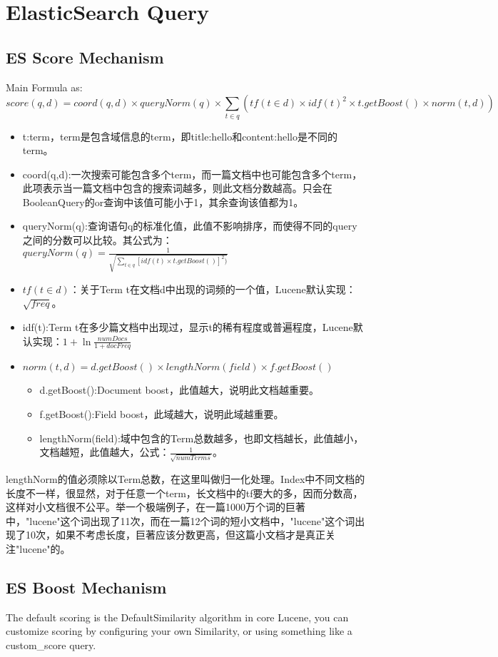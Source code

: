 \section{ElasticSearch Query}
\subsection{ES Score Mechanism}
Main Formula as:
$$score(q,d) = coord(q,d) \times queryNorm(q) \times \sum_{t\in q}(tf(t \in d) \times idf(t)^2 \times t.getBoost() \times norm(t,d)) $$
\begin{itemize}
\item t:term，term是包含域信息的term，即title:hello和content:hello是不同的term。
\item coord(q,d):一次搜索可能包含多个term，而一篇文档中也可能包含多个term，此项表示当一篇文档中包含的搜索词越多，则此文档分数越高。只会在BooleanQuery的or查询中该值可能小于1，其余查询该值都为1。
\item queryNorm(q):查询语句q的标准化值，此值不影响排序，而使得不同的query之间的分数可以比较。其公式为：
$queryNorm(q) =\frac{1}{\sqrt{\sum_{t\in q}[idf(t) \times t.getBoost()]^2)}} $
\item $tf(t \in d)$：关于Term t在文档d中出现的词频的一个值，Lucene默认实现：$\sqrt{freq}$。
\item idf(t):Term t在多少篇文档中出现过，显示t的稀有程度或普遍程度，Lucene默认实现：$1 + \ln{\frac{numDocs}{1+docFreq}}$
\item $norm(t,d)=d.getBoost()\times lengthNorm(field) \times f.getBoost()$
  \begin{itemize}
  \item d.getBoost():Document boost，此值越大，说明此文档越重要。
  \item f.getBoost():Field boost，此域越大，说明此域越重要。
  \item lengthNorm(field):域中包含的Term总数越多，也即文档越长，此值越小，文档越短，此值越大，公式：$\frac{1}{\sqrt{numTerms}}$。
  \end{itemize}
\end{itemize}
\par lengthNorm的值必须除以Term总数，在这里叫做归一化处理。Index中不同文档的长度不一样，很显然，对于任意一个term，长文档中的tf要大的多，因而分数高，这样对小文档很不公平。举一个极端例子，在一篇1000万个词的巨著中，"lucene"这个词出现了11次，而在一篇12个词的短小文档中，"lucene"这个词出现了10次，如果不考虑长度，巨著应该分数更高，但这篇小文档才是真正关注"lucene"的。
\subsection{ES Boost Mechanism}
The default scoring is the DefaultSimilarity algorithm in core Lucene, you can customize scoring by configuring your own Similarity, or using something like a custom\_score query.
